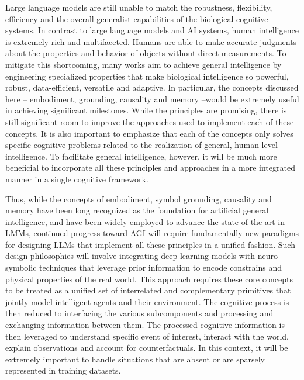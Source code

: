 \documentclass[10pt,journal,compsoc]{IEEEtran}
\begin{document}
	
	Large language models are still unable to match the robustness, flexibility, efficiency and the overall generalist capabilities of the biological cognitive systems. In contrast to large language models and AI systems, human intelligence is extremely rich and multifaceted. Humans are able to make accurate judgments about the properties and behavior of objects without direct measurements. To mitigate this shortcoming, many works aim to achieve general intelligence by engineering specialized properties that make biological intelligence so powerful, robust, data-efficient, versatile and adaptive.  In particular, the concepts discussed here – embodiment, grounding, causality and memory –would be extremely useful in achieving significant milestones. While the principles are promising, there is still significant room to improve the approaches used to implement each of these concepts. It is also important to emphasize that each of the concepts only solves specific cognitive problems related to the realization of general, human-level intelligence. To facilitate general intelligence, however, it will be much more beneficial to incorporate all these principles and approaches in a more integrated manner in a single cognitive framework. 
	
	
	
	Thus, while the concepts of embodiment, symbol grounding, causality and memory have been long recognized as the foundation for artificial general intelligence, and have been widely employed to advance the state-of-the-art in LMMs, continued progress toward AGI will require fundamentally new paradigms for designing LLMs that implement all these principles in a unified fashion.  Such design philosophies will involve integrating deep learning models with neuro-symbolic techniques that leverage prior information to encode constrains and physical properties of the real world.  This approach requires these core concepts to be treated as a unified set of interrelated and complementary primitives that jointly model intelligent agents and their environment.   The cognitive process is then reduced to interfacing the various subcomponents and processing and exchanging information between them.  The processed cognitive information is then leveraged to understand specific event of interest, interact with the world, explain observations and account for counterfactuals. In this context, it will be extremely important to handle situations that are absent or are sparsely represented in training datasets.  
	
\end{document}
